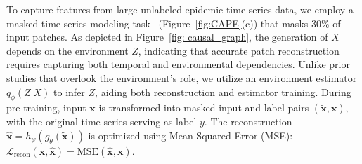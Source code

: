 {%
To capture features from large unlabeled epidemic time series data, we employ a masked time series modeling task~\cite{kamarthi2023pems, goswami2024moment} (Figure~\ref{fig:CAPE}(c)) that masks 30\% of input patches. As depicted in Figure~\ref{fig: causal_graph}, the generation of $X$ depends on the environment \( Z \), indicating that accurate patch reconstruction requires capturing both temporal and environmental dependencies. Unlike prior studies that overlook the environment's role, we utilize an environment estimator \( q_\phi(Z | X) \) to infer \( Z \), aiding both reconstruction and estimator training. During pre-training, input \( \mathbf{x} \) is transformed into masked input and label pairs \((\tilde{\mathbf{x}}, \mathbf{x})\), with the original time series serving as label \( y \). The reconstruction \( \hat{\mathbf{x}} = h_{\psi}(g_\theta(\tilde{\mathbf{x}})) \) is optimized using Mean Squared Error (MSE): 
$\mathcal{L}_{\text{recon}}(\mathbf{x}, \hat{\mathbf{x}}) = \text{MSE}(\hat{\mathbf{x}}, \mathbf{x})$.



}
